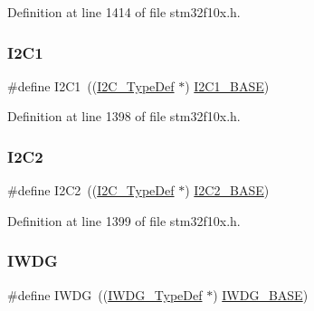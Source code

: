 Definition at line 1414 of file stm32f10x.\+h.

\mbox{\label{group___peripheral__declaration_gab45d257574da6fe1f091cc45b7eda6cc}} 
\subsubsection{\texorpdfstring{I2\+C1}{I2C1}}
{\footnotesize\ttfamily \#define I2\+C1~((\hyperlink{struct_i2_c___type_def}{I2\+C\+\_\+\+Type\+Def} $\ast$) \hyperlink{group___peripheral__memory__map_gacd72dbffb1738ca87c838545c4eb85a3}{I2\+C1\+\_\+\+B\+A\+SE})}



Definition at line 1398 of file stm32f10x.\+h.

\mbox{\label{group___peripheral__declaration_gafa60ac20c1921ef1002083bb3e1f5d16}} 
\subsubsection{\texorpdfstring{I2\+C2}{I2C2}}
{\footnotesize\ttfamily \#define I2\+C2~((\hyperlink{struct_i2_c___type_def}{I2\+C\+\_\+\+Type\+Def} $\ast$) \hyperlink{group___peripheral__memory__map_ga04bda70f25c795fb79f163b633ad4a5d}{I2\+C2\+\_\+\+B\+A\+SE})}



Definition at line 1399 of file stm32f10x.\+h.

\mbox{\label{group___peripheral__declaration_gad16b79dd94ee85d261d08a8ee94187e7}} 
\subsubsection{\texorpdfstring{I\+W\+DG}{IWDG}}
{\footnotesize\ttfamily \#define I\+W\+DG~((\hyperlink{struct_i_w_d_g___type_def}{I\+W\+D\+G\+\_\+\+Type\+Def} $\ast$) \hyperlink{group___peripheral__memory__map_ga8543ee4997296af5536b007cd4748f55}{I\+W\+D\+G\+\_\+\+B\+A\+SE})}



